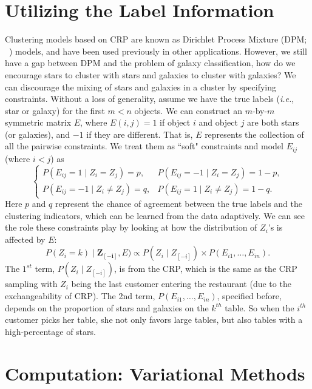 \section{Utilizing the Label Information}

Clustering models based on CRP are known as Dirichlet Process Mixture (DPM; ~\citealt{antoniak74}) models, and have been used previously in other applications. However, we still have a gap between DPM and the problem of galaxy classification, how do we encourage stars to cluster with stars and galaxies to cluster with galaxies? We can discourage the mixing of stars and galaxies in a cluster by specifying  constraints. Without a loss of generality, assume we have the true labels (\textit{i.e.}, star or galaxy) for the first $m<n$ objects. We can construct an $m$-by-$m$ symmetric matrix $E$, where $E(i,j) = 1$ if object $i$ and object $j$ are both stars (or galaxies), and $-1$ if they are different. That is,  $E$ represents the collection of all the pairwise constraints. We treat them as ``soft" constraints and model $E_{ij}$ (where $i<j$) as
\[
\left \{ \begin{array}{ll} P(E_{ij} = 1 \mid Z_i = Z_j) = p, & P(E_{ij} = -1 \mid Z_i = Z_j) = 1- p, \\
P(E_{ij} = -1 \mid Z_i  \ne Z_j) = q, & P(E_{ij} = 1 \mid Z_i \ne  Z_j) = 1-q.
\end{array} \right.
\]
Here $p$ and $q$ represent the chance of agreement between the true labels and the clustering indicators, which can be learned from the data adaptively. We can see the role these constraints play by looking at how the distribution of $Z_i$'s is affected by $E$:
$$
P(Z_i = k) \mid \mathbf{Z_{[-i]}}, E)  \propto  P(Z_i \mid Z_{[-i]}) 
  \times P(E_{i1}, \dots, E_{in}).
$$
The $1^{st}$ term, $P(Z_i \mid Z_{[-i]})$, is from the CRP, which is the same as the CRP sampling with $Z_i$ being the last customer entering the restaurant (due to the  exchangeability of CRP). The 2nd term, $P(E_{i1}, \dots, E_{in})$, specified before, depends on the proportion of stars and galaxies on the $k^{th}$ table. So when the $i^{th}$ customer picks her table, she not only favors large tables, but also tables with a high-percentage of stars. 
 
\section{Computation: Variational Methods}

